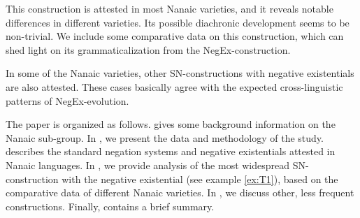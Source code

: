 \documentclass[output=paper]{langscibook}
\begin{document}

This construction is attested in most Nanaic varieties, and it reveals notable differences in different varieties. Its possible diachronic development seems to be non-trivial. We include some comparative data on this construction, which can shed light on its grammaticalization from the NegEx-construction.

In some of the Nanaic varieties, other SN-constructions with negative existentials are also attested. These cases basically agree with the expected cross-linguistic patterns of NegEx-evolution.

The paper is organized as follows.  gives some background information on the Nanaic sub-group. In , we present the data and methodology of the study.  describes the standard negation systems and negative existentials attested in Nanaic languages. In , we provide analysis of the most widespread SN-construction with the negative existential (see example \ref{ex:T1}), based on the comparative data of different Nanaic varieties. In , we discuss other, less frequent constructions. Finally,  contains a brief summary.
\end{document}
